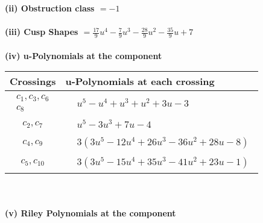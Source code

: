 \documentclass[1p]{elsarticle_modified}
\theoremstyle{definition}
\begin{document}
\flushleft \textbf{(ii) Obstruction class $= -1$}\\~\\
\flushleft \textbf{(iii) Cusp Shapes $= \frac{17}{9} u^4-\frac{7}{9} u^3-\frac{28}{9} u^2-\frac{35}{9} u+7$}\\~\\
\newpage\renewcommand{\arraystretch}{1}
\flushleft \textbf{(iv) u-Polynomials at the component}\newline \\
\begin{tabular}{m{50pt}|m{274pt}}
Crossings & \hspace{64pt}u-Polynomials at each crossing \\
\hline $$\begin{aligned}c_{1},c_{3},c_{6}\\c_{8}\end{aligned}$$&$\begin{aligned}
&u^5- u^4+u^3+u^2+3 u-3
\end{aligned}$\\
\hline $$\begin{aligned}c_{2},c_{7}\end{aligned}$$&$\begin{aligned}
&u^5-3 u^3+7 u-4
\end{aligned}$\\
\hline $$\begin{aligned}c_{4},c_{9}\end{aligned}$$&$\begin{aligned}
&3(3 u^5-12 u^4+26 u^3-36 u^2+28 u-8)
\end{aligned}$\\
\hline $$\begin{aligned}c_{5},c_{10}\end{aligned}$$&$\begin{aligned}
&3(3 u^5-15 u^4+35 u^3-41 u^2+23 u-1)
\end{aligned}$\\
\hline
\end{tabular}\\~\\
\newpage\renewcommand{\arraystretch}{1}
\flushleft \textbf{(v) Riley Polynomials at the component}\newline \\
\end{document}
